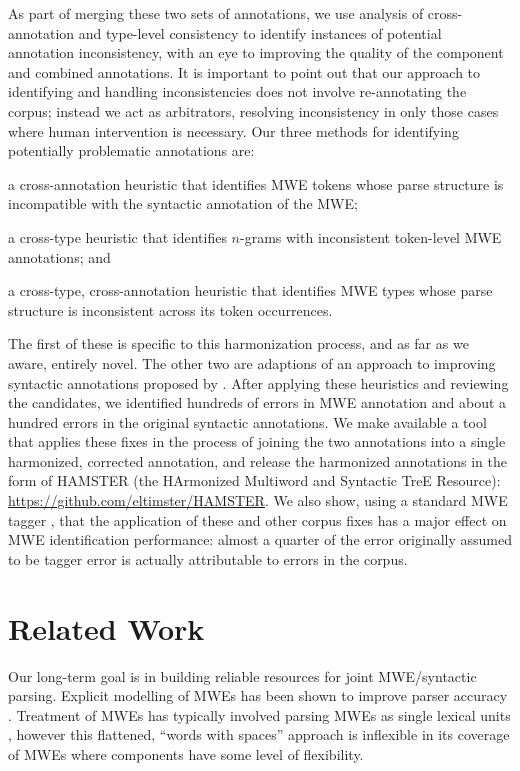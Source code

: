 \documentclass[output=paper
,modfonts
,nonflat]{langsci/langscibook}
\newcommand{\ngram}[1][]{$n$-gram{#1}\xspace}
\begin{document}
As part of merging these two sets of annotations, we use analysis of cross-annotation and type-level consistency to identify instances of potential annotation inconsistency, with an eye to improving the quality of the component and combined annotations. It is important to point out that our approach to identifying and handling inconsistencies does not involve re-annotating the corpus; instead we act as arbitrators, resolving inconsistency in only those cases where human intervention is necessary. Our three methods for identifying potentially problematic annotations are:
\begin{compactitem}
\item a cross-annotation heuristic that identifies MWE tokens whose parse structure is incompatible with the syntactic annotation of the MWE;
\item a cross-type heuristic that identifies \ngram[s] with inconsistent token-level MWE annotations; and
\item a cross-type, cross-annotation heuristic that identifies MWE types whose parse structure is inconsistent across its token occurrences.
\end{compactitem}
The first of these is specific to this harmonization process, and as far as we aware, entirely novel. The other two are adaptions of an approach to improving syntactic annotations proposed by \citet{Dickinson03}. After applying these heuristics and reviewing the candidates, we identified hundreds of errors in MWE annotation and about a hundred errors in the original syntactic annotations. We make available a tool that applies these fixes in the process of joining the two annotations into a single harmonized, corrected annotation, and release the harmonized annotations in the form of HAMSTER (the HArmonized Multiword and Syntactic TreE Resource): \url{https://github.com/eltimster/HAMSTER}. We also show, using a standard MWE tagger \citet{Schneider14b}, that the application of these and other corpus fixes has a major effect on MWE identification performance: almost a quarter of the error originally assumed to be tagger error is actually attributable to errors in the corpus.


\section{Related Work}
\label{sec:relwork}

Our long-term goal is in building reliable resources for joint MWE/syntactic parsing. Explicit modelling of MWEs has been shown to improve parser accuracy \citep{Nivre04,Seretan:Wehrli:2006,Finkel:2009:JPN:1620754.1620802,Wehrli:2010,Korkontzelos:2010:RME:1857999.1858088,Green:2013:PMI:2464100.2464109,Vincze13,Candito14,Constant16}. Treatment of MWEs has typically involved parsing MWEs as single lexical units \citep{Nivre04,Eryigit:2011:MES:2206359.2206365,Fotopoulou14}, however this flattened, ``words with spaces'' \citep{Sag02} approach is inflexible in its coverage of MWEs where components have some level of flexibility.
\end{document}
